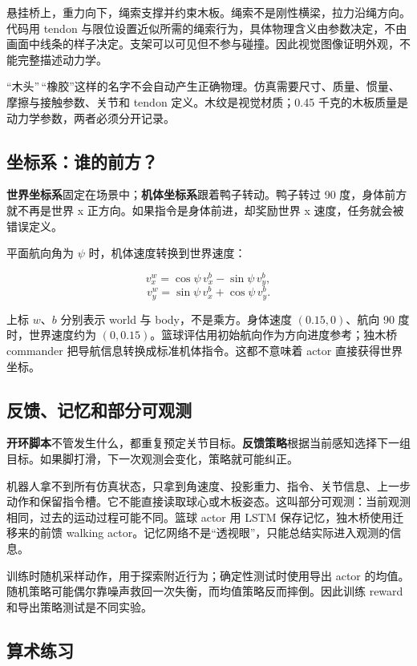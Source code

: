 \documentclass[
  chinese,
  11pt,
  letterpaper,
]{article}
\begin{document}
悬挂桥上，重力向下，绳索支撑并约束木板。绳索不是刚性横梁，拉力沿绳方向。代码用
tendon
与限位设置近似所需的绳索行为，具体物理含义由参数决定，不由画面中线条的样子决定。支架可以可见但不参与碰撞。因此视觉图像证明外观，不能完整描述动力学。

``木头''\,``橡胶''这样的名字不会自动产生正确物理。仿真需要尺寸、质量、惯量、摩擦与接触参数、关节和
tendon 定义。木纹是视觉材质；0.45
千克的木板质量是动力学参数，两者必须分开记录。

\subsection{坐标系：谁的前方？}\label{ux5750ux6807ux7cfbux8c01ux7684ux524dux65b9}

\textbf{世界坐标系}固定在场景中；\textbf{机体坐标系}跟着鸭子转动。鸭子转过
90 度，身体前方就不再是世界 x 正方向。如果指令是身体前进，却奖励世界 x
速度，任务就会被错误定义。

平面航向角为 \(\psi\) 时，机体速度转换到世界速度：

\[v_x^w=\cos\psi\,v_x^b-\sin\psi\,v_y^b,\]
\[v_y^w=\sin\psi\,v_x^b+\cos\psi\,v_y^b.\]

上标 \(w\)、\(b\) 分别表示 world 与 body，不是乘方。身体速度
\((0.15,0)\)、航向 90 度时，世界速度约为
\((0,0.15)\)。篮球评估用初始航向作为方向进度参考；独木桥 commander
把导航信息转换成标准机体指令。这都不意味着 actor 直接获得世界坐标。

\subsection{反馈、记忆和部分可观测}\label{ux53cdux9988ux8bb0ux5fc6ux548cux90e8ux5206ux53efux89c2ux6d4b}

\textbf{开环脚本}不管发生什么，都重复预定关节目标。\textbf{反馈策略}根据当前感知选择下一组目标。如果脚打滑，下一次观测会变化，策略就可能纠正。

机器人拿不到所有仿真状态，只拿到角速度、投影重力、指令、关节信息、上一步动作和保留指令槽。它不能直接读取球心或木板姿态。这叫部分可观测：当前观测相同，过去的运动过程可能不同。篮球
actor 用 LSTM 保存记忆，独木桥使用迁移来的前馈 walking
actor。记忆网络不是``透视眼''，只能总结实际进入观测的信息。

训练时随机采样动作，用于探索附近行为；确定性测试时使用导出 actor
的均值。随机策略可能偶尔靠噪声救回一次失衡，而均值策略反而摔倒。因此训练
reward 和导出策略测试是不同实验。

\subsection{算术练习}\label{ux7b97ux672fux7ec3ux4e60}
\end{document}
